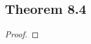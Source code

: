 \documentclass[../../main.tex]{subfiles}
\begin{document}
\subsection{Theorem 8.4}
\begin{wts}

\end{wts}
\begin{proof}

\end{proof}
\end{document}
